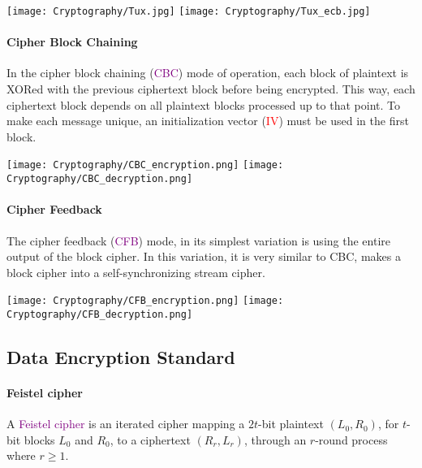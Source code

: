 \documentclass[a4paper, 11pt, openany]{book}
\numberwithin{equation}{section}
\theoremstyle{plain}
\theoremstyle{definition}
\newcommand{\Important}[1]{\textcolor{red}{#1}}
\newcommand{\Define}[1]{\textcolor{purple}{#1}}
\begin{document}
\begin{center}
    \texttt{[image: Cryptography/Tux.jpg]} \hspace{2cm} \texttt{[image: Cryptography/Tux\_ecb.jpg]}
\end{center}

\paragraph{Cipher Block Chaining}
In the cipher block chaining (\Define{CBC}) mode of operation, each block of plaintext is XORed with the previous ciphertext block before being encrypted. This way, each ciphertext block depends on all plaintext blocks processed up to that point. To make each message unique, an initialization vector (\Important{IV}) must be used in the first block.


\begin{center}
    \texttt{[image: Cryptography/CBC\_encryption.png]}
    \texttt{[image: Cryptography/CBC\_decryption.png]}
\end{center}


\paragraph{Cipher Feedback}
The cipher feedback (\Define{CFB}) mode, in its simplest variation is using the entire output of the block cipher. In this variation, it is very similar to CBC, makes a block cipher into a self-synchronizing stream cipher. 



\begin{center}
    \texttt{[image: Cryptography/CFB\_encryption.png]}
    \texttt{[image: Cryptography/CFB\_decryption.png]}
\end{center}












\subsection{Data Encryption Standard}

\paragraph{Feistel cipher}
A \Define{Feistel cipher} is an iterated cipher mapping a $2t$-bit plaintext $(L_0,R_0)$, for
$t$-bit blocks $L_0$ and $R_0$, to a ciphertext $(R_r, L_r)$, through an $r$-round process where $r \ge 1$.
\end{document}
